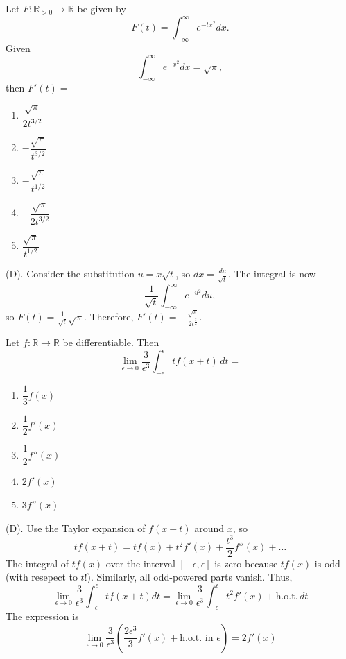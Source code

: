 \begin{exercise}
Let $F:\mathbb{R}_{>0}\to\mathbb{R}$ be given by
\[
F(t)=\int_{-\infty}^{\infty}e^{-tx^2} dx.
\]
Given
\[
\int_{-\infty}^{\infty}e^{-x^2} dx=\sqrt{\pi},
\]
then $F'(t)=$

\begin{enumerate}[label=(\Alph*)]
    \item $\dfrac{\sqrt{\pi}}{2t^{3/2}}$
    \item $-\dfrac{\sqrt{\pi}}{t^{3/2}}$
    \item $-\dfrac{\sqrt{\pi}}{t^{1/2}}$
    \item $-\dfrac{\sqrt{\pi}}{2t^{3/2}}$
    \item $\dfrac{\sqrt{\pi}}{t^{1/2}}$
\end{enumerate}
\end{exercise}
\begin{solution}
(D). Consider the substitution $u = x\sqrt{t}$, so $dx = \frac{du}{\sqrt{t}}$.
The integral is now
\[
\frac{1}{\sqrt{t}} \int_{-\infty}^{\infty}e^{-u^2} du,
\]
so $F(t) = \frac{1}{\sqrt{t}} \sqrt{\pi}$. Therefore, 
$F'(t) = -\frac{\sqrt{\pi}}{2t^{\frac{3}{2}}}$.
\end{solution}

\begin{exercise}
Let $f:\mathbb{R}\to\mathbb{R}$ be differentiable. Then
\[
\lim_{\epsilon\to0}
\frac{3}{\epsilon^3}
\int_{-\epsilon}^{\epsilon} t f(x+t)\,dt
=
\]

\begin{enumerate}[label=(\Alph*)]
    \item $\dfrac{1}{3}f(x)$
    \item $\dfrac{1}{2}f'(x)$
    \item $\dfrac{1}{2}f''(x)$
    \item $2f'(x)$
    \item $3f''(x)$
\end{enumerate}
\end{exercise}
\begin{solution}
(D). Use the Taylor expansion of $f(x + t)$ around $x$, so
\[
tf(x + t) =tf(x) + t^2f'(x) + \frac{t^3}{2}f''(x) + \dots
\]
The integral of $tf(x)$ over the interval $[-\epsilon, \epsilon]$ is zero 
because $tf(x)$ is odd (with resepect to $t$!). Similarly, all odd-powered
parts vanish. Thus,
\[
\lim_{\epsilon\to0} \frac{3}{\epsilon^3}\int_{-\epsilon}^{\epsilon} t f(x+t) dt
= \lim_{\epsilon\to0} \frac{3}{\epsilon^3}\int_{-\epsilon}^{\epsilon}t^2f'(x) + \text{h.o.t.} \, dt
\]
The expression is
\[
\lim_{\epsilon\to0} \frac{3}{\epsilon^3} (\frac{2\epsilon^3}{3}f'(x)+ \text{h.o.t. in $\epsilon$}) = 2f'(x)
\]
\end{solution}

